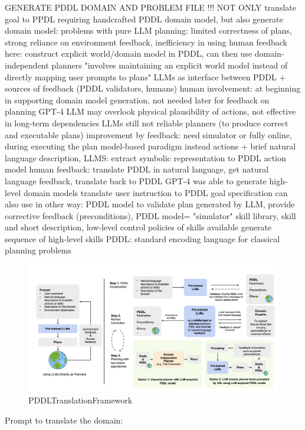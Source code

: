 \documentclass{article}
\begin{document}
GENERATE PDDL DOMAIN AND PROBLEM FILE
!!! NOT ONLY translate goal to PPDL requiring handcrafted PDDL domain model, but also generate domain model:
\cite{guan_leveraging_2023}
problems with pure LLM planning: limited correctness of plans, strong reliance on environment feedback, inefficiency in using human feedback
here: construct explicit world/domain model in PDDL, can then use domain-independent planners
"involves maintaining an explicit world model instead of directly mapping user prompts to plans"
LLMs as interface between PDDL + sources of feedback (PDDL validators, humans)
human involvement: at beginning in supporting domain model generation, not needed later for feedback on planning
GPT-4
LLM may overlook physical plausibility of actions, not effective in long-term dependencies
LLMs still not reliable planners (to produce correct and executable plans)
improvement by feedback: need simulator or fully online, during executing the plan
model-based paradigm instead
actions + brief natural language description, LLMS: extract symbolic representation to PDDL action model
human feedback: translate PDDL in natural language, get natural language feedback, translate back to PDDL
GPT-4 was able to generate high-level domain models
translate user instruction to PDDL goal specification
can also use in other way: PDDL model to validate plan generated by LLM, provide corrective feedback (preconditions), PDDL model= "simulator"
skill library, skill and short description, low-level control policies of skills available
generate sequence of high-level skills
PDDL: standard encoding language for classical planning problems
\begin{figure}[h]
	\centering
	\includegraphics[width=1.0\linewidth]{PDDLTranslationFramework.png}
	\caption{PDDLTranslationFramework 
		\cite{guan_leveraging_2023}}
	\label{fig:pddltranslationframework}
\end{figure}
Prompt to translate the domain:
\end{document}
